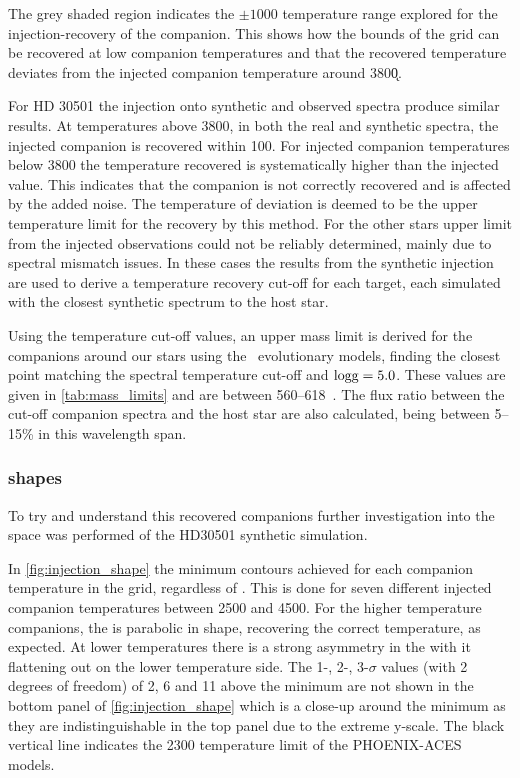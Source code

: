 The grey shaded region indicates the \(\pm 1000\)\K{} temperature range explored for the injection-recovery of the companion.
This shows how the bounds of the grid can be recovered at low companion temperatures and that the recovered temperature deviates from the injected companion temperature around 3800\k{}.

For {HD 30501} the injection onto synthetic and observed spectra produce similar results.
At temperatures above 3800\K{}, in both the real and synthetic spectra, the injected companion is recovered within 100\K{}.
For injected companion temperatures below 3800\K{} the temperature recovered is systematically higher than the injected value.
This indicates that the companion is not correctly recovered and is affected by the added noise.
The temperature of deviation is deemed to be the upper temperature limit for the recovery by this method.
For the other stars upper limit from the injected observations could not be reliably determined, mainly due to spectral mismatch issues.
In these cases the results from the synthetic injection are used to derive a temperature recovery cut-off for each target, each simulated with the closest synthetic spectrum to the host star.

Using the temperature cut-off values, an upper mass limit is derived for the companions around our stars using the~\citet{baraffe_new_2015} evolutionary models, finding the closest point matching the spectral temperature cut-off and \(\textrm{logg}{}=5.0\).
These values are given in \cref{tab:mass_limits} and are between 560--618~\Mjup{}.
The flux ratio between the cut-off companion spectra and the host star are also calculated, being between 5--15\% in this wavelength span.




\subsubsection{\texorpdfstring{\textchisquared}\ shapes}
\label{subsubsec:chi2_shapes}
To try and understand this recovered companions further investigation into the \textchisquared{} space was performed of the {HD30501} synthetic simulation.

In \cref{fig:injection_shape} the minimum \textchisquared{} contours achieved for each companion temperature in the grid, regardless of \Rvtwo{}.
This is done for seven different injected companion temperatures between 2500 and 4500\K{}.
For the higher temperature companions, the \textchisquared{} is parabolic in shape, recovering the correct temperature, as expected.
At lower temperatures there is a strong asymmetry in the \textchisquared{} with it flattening out on the lower temperature side.
The 1-, 2-, 3-\(\sigma\) values (with 2 degrees of freedom) of 2, 6 and 11 above the minimum \textchisquared{} are not shown in the bottom panel of \cref{fig:injection_shape} which is a close-up around the minimum \textchisquared{} as they are indistinguishable in the top panel due to the extreme \textchisquared{} y-scale.
The black vertical line indicates the 2300\K{} temperature limit of the {PHOENIX-ACES} models.

